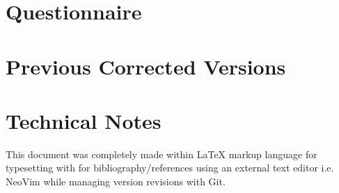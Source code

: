 \documentclass[12pt]{report}
\begin{document}
\appendix
\chapter{Questionnaire}
\lipsum
\chapter{Previous Corrected Versions}
\lipsum
\chapter{Technical Notes}

This document was completely made within {\LaTeX} markup language for
typesetting with  for bibliography/references using an external
text editor i.e. NeoVim while managing version revisions with Git.
\end{document}
